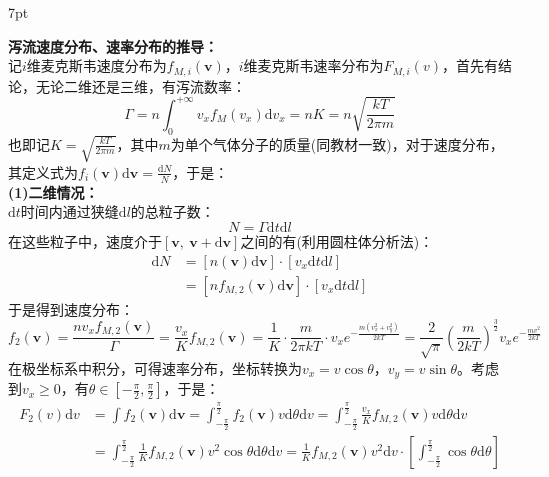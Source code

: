 \documentclass[zihao=5,UTF8]{report}
\newenvironment{graybox}{%
\def\FrameCommand{%
\hspace{1pt}%
{\color{gray}\small \vrule width 2pt}%
{\color{graybox_color}\vrule width 4pt}%
\colorbox{graybox_color}%
}%
\MakeFramed{\advance\hsize-\width\FrameRestore}%
\noindent\hspace{-4.55pt}%
\begin{adjustwidth}{}{7pt}%
\vspace{2pt}\vspace{2pt}%
}
{%
\vspace{2pt}\end{adjustwidth}\endMakeFramed%
}
\begin{document}
\begin{graybox}
\textbf{泻流速度分布、速率分布的推导：}\\
记$i$维麦克斯韦速度分布为$f_{M,i}(\boldsymbol{v})$，$i$维麦克斯韦速率分布为$F_{M,i}(v)$，首先有结论，无论二维还是三维，有泻流数率：
\begin{equation}
    \Gamma =  n \int_{0}^{+\infty}v_xf_M(v_x)\mathrm{d}v_x =nK =n \sqrt{\frac{kT}{2\pi m}}
\end{equation}
也即记$K = \sqrt{\frac{kT}{2\pi m}}$，其中$m$为单个气体分子的质量(同教材一致)，对于速度分布，其定义式为$f_i(\boldsymbol{v}) \mathrm{d}\boldsymbol{v} = \frac{\mathrm{d}N}{N}$，于是：\\ \textbf{(1)二维情况：}\\
$\mathrm{d}t$时间内通过狭缝$\mathrm{d}l$的总粒子数：
\begin{equation}
    N = \Gamma \mathrm{d}t\mathrm{d}l
\end{equation}
在这些粒子中，速度介于$[\boldsymbol{v},\ \boldsymbol{v} + \mathrm{d}\boldsymbol{v} ]$之间的有(利用圆柱体分析法)：
\begin{align*}
    \mathrm{d}N & = \left[ n(\boldsymbol{v})\mathrm{d}\boldsymbol{v}  \right]\cdot \left[ v_x \mathrm{d}t\mathrm{d}l \right]\\
    & = \left[ nf_{M,2}(\boldsymbol{v})\mathrm{d}\boldsymbol{v}  \right]\cdot \left[ v_x \mathrm{d}t\mathrm{d}l \right]
\end{align*}
于是得到速度分布：
\begin{equation}
    f_2(\boldsymbol{v}) = \frac{nv_xf_{M,2}(\boldsymbol{v})}{\Gamma} = \frac{v_x}{K}f_{M,2}(\boldsymbol{v}) = \frac{1}{K}\cdot \frac{m}{2\pi kT}\cdot v_xe^{-\frac{m(v_x^2 + v_y^2)}{2kT}} = \frac{2}{\sqrt{\pi}} \left(\frac{m}{2kT}\right)^{\frac{3}{2}}v_xe^{-\frac{mv^2}{2kT}}
\end{equation}
在极坐标系中积分，可得速率分布，坐标转换为$v_x = v \cos \theta$，$v_y = v \sin \theta$。考虑到$v_x \ge 0 $，有$\theta \in [-\frac{\pi}{2}, \frac{\pi}{2}]$，于是：
\begin{align*}
    F_2(v)\mathrm{d}v 
    & = \int f_2(\boldsymbol{v}) \mathrm{d}\boldsymbol{v}
     = \int_{-\frac{\pi}{2}}^{\frac{\pi}{2}}f_2(\boldsymbol{v}) v \mathrm{d}\theta \mathrm{d}v 
    =   \int_{-\frac{\pi}{2}}^{\frac{\pi}{2}} \frac{v_x}{K}f_{M,2}(\boldsymbol{v}) v \mathrm{d}\theta \mathrm{d}v  \\
    & = \int_{-\frac{\pi}{2}}^{\frac{\pi}{2}} \frac{1}{K}f_{M,2}(\boldsymbol{v}) v^2 \cos \theta \mathrm{d}\theta \mathrm{d}v 
    = \frac{1}{K}f_{M,2}(\boldsymbol{v}) v^2 \mathrm{d}v \cdot \left[ \int_{-\frac{\pi}{2}}^{\frac{\pi}{2}}  \cos \theta \mathrm{d}\theta\right]\\

\end{align*}
\end{graybox}
\end{document}
